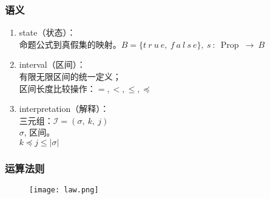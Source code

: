 \subsubsection{语义}

\begin{enumerate}
  \item state（状态）：\\
    命题公式到真假集的映射。$B=\{t ~r ~u~ e, ~f~ a ~l~ s ~e\}, ~s ~: ~\operatorname{Prop}~ \longrightarrow~ B$
  \item interval（区间）：\\
    有限无限区间的统一定义；\\
    区间长度比较操作：$=,<, \leq, \preceq$
  \item interpretation（解释）：\\
    三元组：$\mathcal{I}=(\sigma, ~k, ~j)$ \\
    $\sigma$, 区间。\\
    $k \preceq j \leq|\sigma|$

\end{enumerate}


\subsubsection{运算法则}

\begin{figure}[!h]
  \centering
  \texttt{[image: law.png]}
\end{figure}



